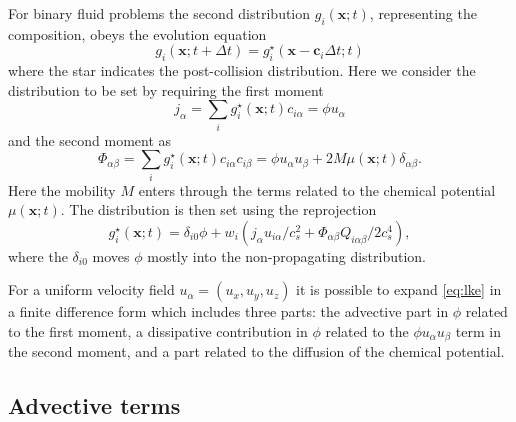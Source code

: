 For binary fluid problems the second distribution $g_i (\mathbf{x};t)$,
representing the composition, obeys the evolution equation
\begin{equation}
g_i (\mathbf{x}; t + \Delta t )
= g_i^\star (\mathbf{x} - \mathbf{c}_i \Delta t; t)
\label{lke}
\end{equation}
where the star indicates the post-collision distribution. Here we consider
the distribution to be set by requiring the first moment
\begin{equation}
j_\alpha = \sum_i g_i^\star (\mathbf{x};t) c_{i\alpha} = \phi u_\alpha
\label{eq:moment1}
\end{equation}
and the second moment as
\begin{equation}
\Phi_{\alpha\beta} = \sum_i g_i^\star (\mathbf{x}; t) c_{i\alpha} c_{i\beta}
= \phi u_\alpha u_\beta + 2M\mu (\mathbf{x};t) \delta_{\alpha\beta}.
\end{equation}
Here the mobility $M$ enters through the terms related to the chemical
potential $\mu (\mathbf{x};t)$. The distribution is then set using the
reprojection
\begin{equation}
g_i^\star (\mathbf{x}; t) = \delta_{i0}\phi
+ w_i (j_\alpha u_{i\alpha} / c_s^2
+      \Phi_{\alpha\beta} Q_{i\alpha\beta} / 2c_s^4),
\end{equation}
where the $\delta_{i0}$ moves $\phi$ mostly into the non-propagating
distribution.

For a uniform velocity field $u_\alpha = (u_x, u_y, u_z)$ it is possible
to expand \ref{eq:lke} in a finite difference form which includes three
parts: the advective part in $\phi$ related to the first moment, a
dissipative contribution in $\phi$ related to the $\phi u_\alpha u_\beta$
term in the second moment, and a part related to the
 diffusion of the chemical potential.

\subsection{Advective terms}

